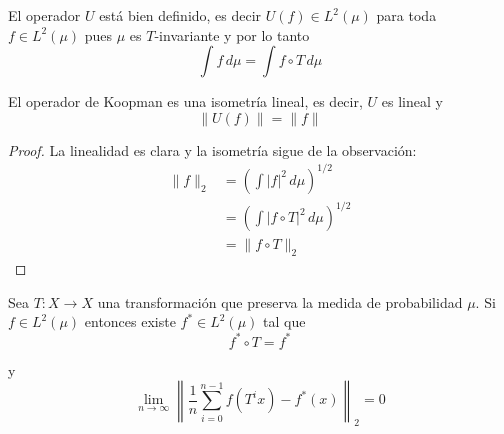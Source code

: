 \documentclass[	docname= Sistemas\ Din\'amicos,
				finished=1,
				semester=1,
				year=2017,
				professor=Godofredo\ Iommi,
				sigla=MAT2565]{apunte}
\begin{document}
\begin{obsd} El operador $U$ está bien definido, es decir $U(f) \in L^{2}(\mu)$ para toda $f \in L^{2}(\mu)$ pues $\mu$ es $T$-invariante y por lo tanto
	$$\int f \, d\mu = \int f \circ T \, d\mu$$
\end{obsd}

\begin{lem} El operador de Koopman es una isometría lineal, es decir, $U$ es lineal y
	$$\|U(f)\| = \|f\|$$
\end{lem}

\begin{proof} La linealidad es clara y la isometría sigue de la observación:
	\begin{align*}
		\|f\|_{2}
			&=	\left(\int |f|^{2} \, d\mu\right)^{1/2}	\\
			&=	\left(\int |f \circ T|^{2} \, d\mu\right)^{1/2}	\\
			&=	\|f \circ T\|_{2}
	\end{align*}
\end{proof}

\begin{teo} Sea $T : X \to X$ una transformación que preserva la medida de probabilidad $\mu$. Si $f \in L^{2}(\mu)$ entonces existe $f^{*} \in L^{2}(\mu)$ tal que
	$$f^{*} \circ T = f^{*}$$
	
y
	$$\lim_{n \to \infty} \left\| \frac{1}{n} \sum_{i=0}^{n-1} f(T^{i}x) - f^{*}(x)\right\|_{2} = 0$$  
\end{teo}
\end{document}
